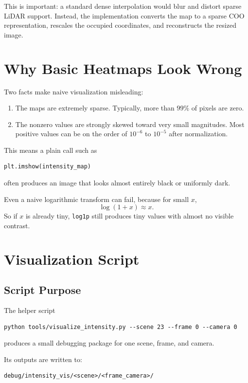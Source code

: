 \documentclass[11pt]{article}
\begin{document}
This is important: a standard dense interpolation would blur and distort sparse LiDAR support. Instead, the implementation converts the map to a sparse COO representation, rescales the occupied coordinates, and reconstructs the resized image.

\section{Why Basic Heatmaps Look Wrong}
Two facts make naive visualization misleading:

\begin{enumerate}[leftmargin=1.5em]
    \item The maps are extremely sparse. Typically, more than $99\%$ of pixels are zero.
    \item The nonzero values are strongly skewed toward very small magnitudes. Most positive values can be on the order of $10^{-6}$ to $10^{-5}$ after normalization.
\end{enumerate}

This means a plain call such as
\begin{lstlisting}[style=pystyle,language=Python]
plt.imshow(intensity_map)
\end{lstlisting}
often produces an image that looks almost entirely black or uniformly dark.

Even a naive logarithmic transform can fail, because for small $x$,
\[
\log(1 + x) \approx x.
\]
So if $x$ is already tiny, \texttt{log1p} still produces tiny values with almost no visible contrast.

\section{Visualization Script}

\subsection{Script Purpose}
The helper script
\begin{lstlisting}[style=bashstyle]
python tools/visualize_intensity.py --scene 23 --frame 0 --camera 0
\end{lstlisting}
produces a small debugging package for one scene, frame, and camera.

Its outputs are written to:
\begin{lstlisting}[style=bashstyle]
debug/intensity_vis/<scene>/<frame_camera>/
\end{lstlisting}
\end{document}
